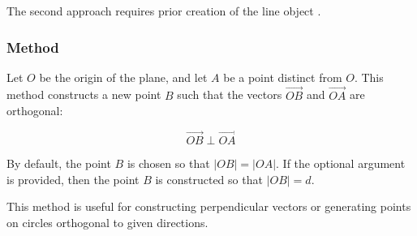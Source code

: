 \noindent
The second approach requires prior creation of the line object .

\vspace{1em}

\begin{tkzexample}[latex=8cm]
\end{tkzexample}


\subsubsection{Method } %
\label{ssub:orthogonal_method}

Let $O$ be the origin of the plane, and let $A$ be a point distinct from $O$. This method constructs a new point $B$ such that the vectors $\overrightarrow{OB}$ and $\overrightarrow{OA}$ are orthogonal:

\[
\overrightarrow{OB} \perp \overrightarrow{OA}
\]

\medskip
\noindent
By default, the point $B$ is chosen so that $|OB| = |OA|$. If the optional argument  is provided, then the point $B$ is constructed so that $|OB| = d$.

\medskip
\noindent
This method is useful for constructing perpendicular vectors or generating points on circles orthogonal to given directions.

\vspace{1em}


\begin{tkzexample}[latex=7cm]
\begin{center}
\end{center}
\end{tkzexample}


